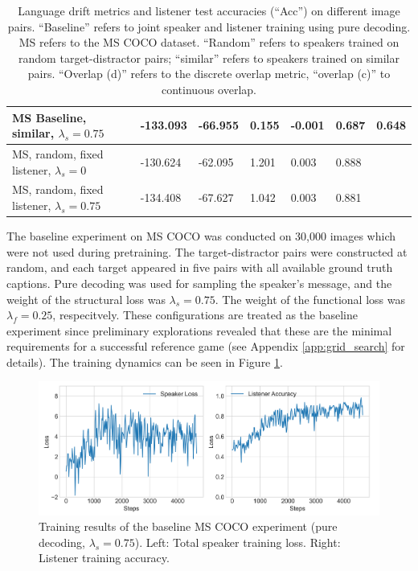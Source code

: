 \begin{table}[]
\begin{tabularx}{\textwidth}{|X|l|l|X|X|X|X|}
		MS Baseline, similar, $\lambda_s = 0.75$  &     -133.093              &       -66.955                &               0.155       &       -0.001               &      0.687             &                               0.648            \\ \hline
		MS, random, fixed listener, $\lambda_s = 0$  &         -130.624         &           -62.095             &     1.201                 &        0.003              &                          0.888                &                                           \\ \hline
		MS, random, fixed listener, $\lambda_s = 0.75$  &         -134.408          &           -67.627             &     1.042                 &        0.003              &                          0.881                &                                           \\ \hline
	\end{tabularx}
\caption{\label{tab:coco_drift_metrics_basic} Language drift metrics and listener test accuracies (``Acc'') on different image pairs. 
	``Baseline'' refers to joint speaker and listener training using pure decoding. MS refers to the MS COCO dataset. ``Random'' refers to speakers trained on random target-distractor pairs; ``similar'' refers to speakers trained on similar pairs. ``Overlap (d)'' refers to the discrete overlap metric, ``overlap (c)'' to continuous overlap.}
\end{table}

The baseline experiment on MS COCO was conducted on 30,000 images which were not used during pretraining. The target-distractor pairs were constructed at random, and each target appeared in five pairs with all available ground truth captions. Pure decoding was used for sampling the speaker's message, and the weight of the structural loss was $\lambda_s = 0.75$. The weight of the functional loss was $\lambda_f = 0.25$, respecitvely. These configurations are treated as the baseline experiment since preliminary explorations revealed that these are the minimal requirements for a successful reference game (see Appendix \ref{app:grid_search} for details). The training dynamics can be seen in Figure \ref{fig:coco_baseline_075_speaker_loss_listener_acc}.

\begin{figure}[h]
	\centering
	\includegraphics[width=\linewidth]{images/coco_refgame_4000_pure_075_random.png}
	\caption{Training results of the baseline MS COCO experiment (pure decoding, $\lambda_s = 0.75$). Left: Total speaker training loss. Right: Listener training accuracy.}
	\label{fig:coco_baseline_075_speaker_loss_listener_acc}
\end{figure}

